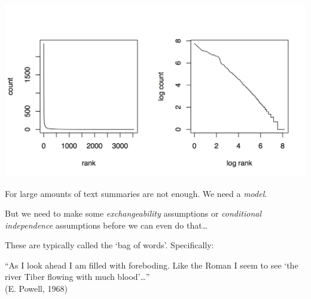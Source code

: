 \documentclass{mediumfoils}
\begin{document}
\begin{center}
\includegraphics[scale=1.2]{pictures/zipfy}
\end{center}



For large amounts of text summaries are not enough. We need a \textit{model}.

But we need to make some \textsl{exchangeability} assumptions or 
\textit{conditional independence} assumptions before we can even do that\ldots


These are typically called the `bag of words'.  Specifically:


``As I look ahead I am filled with foreboding.  Like the Roman I seem to see `the river Tiber flowing with much blood'\ldots ''\\
(E. Powell, 1968)


\end{document}
